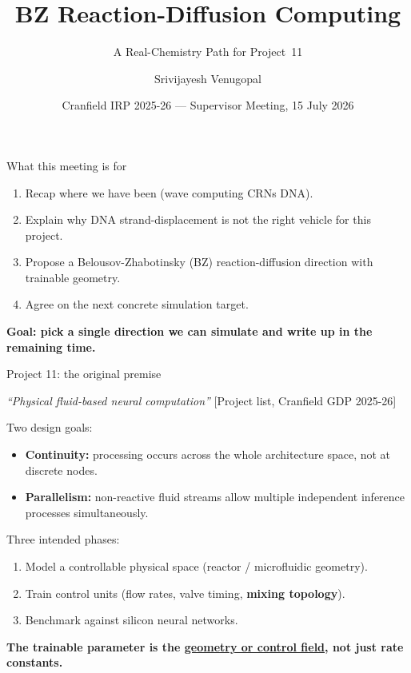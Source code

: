 \documentclass[aspectratio=169,11pt]{beamer}
\title{BZ Reaction-Diffusion Computing}
\subtitle{A Real-Chemistry Path for Project~11}
\author{Srivijayesh Venugopal}
\date{Cranfield IRP 2025-26 --- Supervisor Meeting, 15 July 2026}
\newcommand{\citeslide}[1]{\hfill{\footnotesize [#1]}}
\begin{document}
\begin{frame}
\titlepage
\end{frame}

\begin{frame}{What this meeting is for}

\begin{enumerate}
    \item Recap where we have been (wave computing \textrightarrow{} CRNs \textrightarrow{} DNA).
    \item Explain why DNA strand-displacement is not the right vehicle for this project.
    \item Propose a Belousov-Zhabotinsky (BZ) reaction-diffusion direction with trainable geometry.
    \item Agree on the next concrete simulation target.
\end{enumerate}

\vspace{0.5cm}
\centering
\textbf{Goal: pick a single direction we can simulate and write up in the remaining time.}

\end{frame}

\begin{frame}{Project 11: the original premise}

\textit{``Physical fluid-based neural computation''} \citeslide{Project list, Cranfield GDP 2025-26}

\vspace{0.4cm}
Two design goals:
\begin{itemize}
    \item \textbf{Continuity:} processing occurs across the whole architecture space, not at discrete nodes.
    \item \textbf{Parallelism:} non-reactive fluid streams allow multiple independent inference processes simultaneously.
\end{itemize}

\vspace{0.3cm}
Three intended phases:
\begin{enumerate}
    \item Model a controllable physical space (reactor / microfluidic geometry).
    \item Train control units (flow rates, valve timing, \textbf{mixing topology}).
    \item Benchmark against silicon neural networks.
\end{enumerate}

\vspace{0.3cm}
\centering
\textbf{The trainable parameter is the \underline{geometry or control field}, not just rate constants.}

\end{frame}
\end{document}

